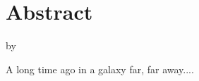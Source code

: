 \doublespacing
\chapter*{Abstract}
\thesistitle
\begin{flushleft}
by \authorname \\
\end{flushleft}

A long time ago in a galaxy far, far away....


